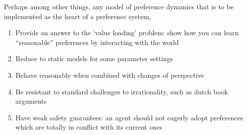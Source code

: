 \documentclass{article}
\begin{document}
	Perhaps among other things, any model of preference dynamics that is to be implemented as the heart of a preference system, 
	\begin{enumerate}[noitemsep]
		\item Provide an answer to the `value loading' problem: show how you can learn ``reasonable'' preferences by interacting with the world
		\item Reduce to static models for some parameter settings
		\item Behave reasonably when combined with changes of perspective 
		\item Be resistant to standard challenges to irrationality, such as dutch book arguments
		\item Have weak safety guarantees: an agent should not eagerly adopt preferences which are totally in conflict with its current ones
	\end{enumerate}
	
\end{document}
